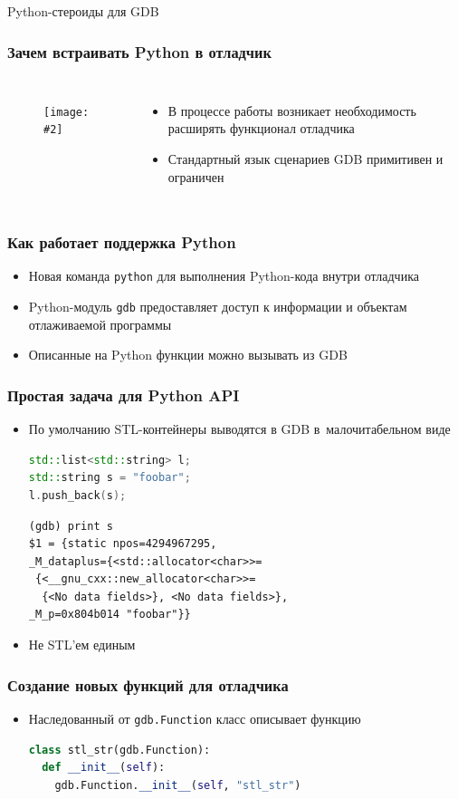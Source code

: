 \documentclass[onlymath]{beamer}
\newcommand\code\texttt
\newcommand{\cenfig}[2]{\begin{figure}\centering\texttt{[image: \#2]}
  \end{figure}}
\begin{document}
\begin{subsection}{Python-стероиды для GDB}
\begin{frame}
  \frametitle{Зачем встраивать Python в отладчик}
  \begin{columns}
    \cenfig{0.2}{python.png}
  \begin{itemize}
  \item В процессе работы возникает необходимость расширять функционал
    отладчика
  \item Стандартный язык сценариев GDB примитивен и ограничен
  \end{itemize}
\end{columns}
\end{frame}

\begin{frame}
  \frametitle{Как работает поддержка Python}
  \begin{itemize}
  \item Новая команда \code{python} для выполнения Python-кода внутри
    отладчика
  \item Python-модуль \code{gdb} предоставляет доступ к информации и
    объектам отлаживаемой программы
  \item Описанные на Python функции можно вызывать из GDB
  \end{itemize}
\end{frame}

\begin{frame}[fragile]
  \frametitle{Простая задача для Python API}
  \begin{itemize}
  \item По умолчанию STL-контейнеры выводятся в GDB в малочитабельном
    виде
\begin{lstlisting}[language=C++]
std::list<std::string> l;
std::string s = "foobar";
l.push_back(s);
\end{lstlisting}
\begin{lstlisting}[language=gdb,frameround=tttt]
(gdb) print s
$1 = {static npos=4294967295, 
_M_dataplus={<std::allocator<char>>= 
 {<__gnu_cxx::new_allocator<char>>=
  {<No data fields>}, <No data fields>},
_M_p=0x804b014 "foobar"}}
\end{lstlisting}
\item Не STL’ем единым
  \end{itemize}
\end{frame}

\begin{frame}[fragile]
  \frametitle{Создание новых функций для отладчика}
  \begin{itemize}
  \item Наследованный от \code{gdb.Function} класс описывает функцию
\begin{lstlisting}[language=Python]
class stl_str(gdb.Function):
  def __init__(self):
    gdb.Function.__init__(self, "stl_str")


\end{lstlisting}
\end{itemize}
\end{frame}
\end{subsection}
\end{document}
